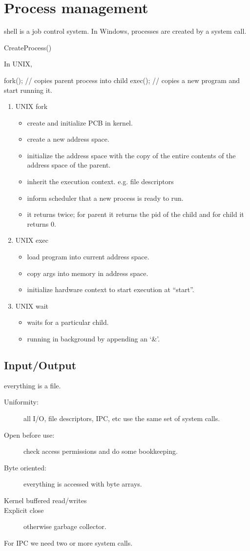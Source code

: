 \section{Process management}
shell is a job control system. In Windows, processes are created by a system call.
\begin{codeC}
    CreateProcess()
\end{codeC}

In UNIX,
\begin{codeC}
    fork(); // copies parent process into child
    exec(); // copies a new program and start running it.
\end{codeC}
\begin{enumerate}
    \item UNIX fork 
    \begin{itemize}
        \item create and initialize PCB in kernel.
        \item create a new address space.
        \item initialize the address space with the copy of the entire contents of the address space of the parent.
        \item inherit the execution context. e.g. file descriptors
        \item inform scheduler that a new process is ready to run.
        \item it returns twice; for parent it returns the pid of the child and for child it returns 0.
    \end{itemize}
    \item UNIX exec 
    \begin{itemize}
        \item load program into current address space.
        \item copy args into memory in address space.
        \item initialize hardware context to start execution at ``start''.
    \end{itemize}
    \item UNIX wait
    \begin{itemize}
        \item waits for a particular child.
        \item running in background by appending an `\&'.
    \end{itemize}
\end{enumerate}
\subsection{Input/Output}
everything is a file. 
\begin{description}
    \item[Uniformity:] all I/O, file descriptors, IPC, etc use the same set of system calls.
    \item[Open before use:] check access permissions and do some bookkeeping.
    \item[Byte oriented:]  everything is accessed with byte arrays.
    \item[Kernel buffered read/writes] 
    \item[Explicit close] otherwise garbage collector.     
\end{description}
For IPC we need two or more system calls.
